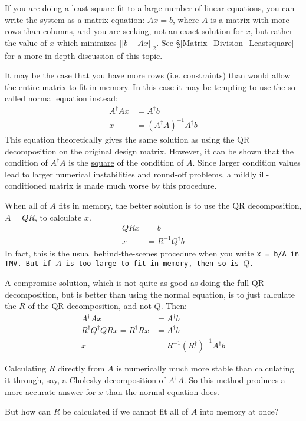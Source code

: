 If you are doing a 
least-square fit to a large number of linear equations, you can write the system as
a matrix equation: 
$A x = b$, where $A$ is a matrix with more rows than columns, and you are seeking,
not an exact solution for $x$, but rather the value of $x$ which minimizes
$||b-Ax||_2$.  See \S\ref{Matrix_Division_Leastsquare} for a more in-depth discussion of this topic.

It may be the case that you
have more rows (i.e. constraints) than would allow the entire matrix to fit in memory.  
In this case it may be tempting to use the so-called normal equation instead: 
\begin{align*}
A^\dagger A x &= A^\dagger b \\
x & = (A^\dagger A)^{-1} A^\dagger b
\end{align*}
This equation theoretically gives the same 
solution as using the QR decomposition on the original design matrix.
However, it can be shown that the condition of $A^\dagger A$ is the 
\underline{square} of the condition of $A$.  Since larger condition values
lead to larger numerical instabilities and round-off problems, a mildly
ill-conditioned matrix is made much worse by this procedure.

When all of $A$ fits in memory, the better solution is to use the QR decomposition, $A = QR$,
to calculate $x$.
\begin{align*}
Q R x &= b \\
x &= R^{-1} Q^\dagger b
\end{align*}
In fact, this is the usual behind-the-scenes procedure when you write \tt{x = b/A} in TMV.
But if $A$ is too large to fit in memory, then so is $Q$.

A compromise solution, which is not quite as good as doing the full QR decomposition,
but is better than using the normal equation, is to just calculate the $R$ of the
QR decomposition, and not $Q$.  Then:
\begin{align*}
A^\dagger A x &= A^\dagger b \\
R^\dagger Q^\dagger Q R x = R^\dagger R x &= A^\dagger b \\
x &= R^{-1} (R^\dagger)^{-1} A^\dagger b
\end{align*}

Calculating $R$ directly from $A$ is numerically much more stable than 
calculating it through, say, a Cholesky decomposition of $A^\dagger A$.
So this method produces a more accurate answer for $x$ than the normal equation does.

But how can $R$ be calculated if we cannot fit all of $A$ into memory at once?


